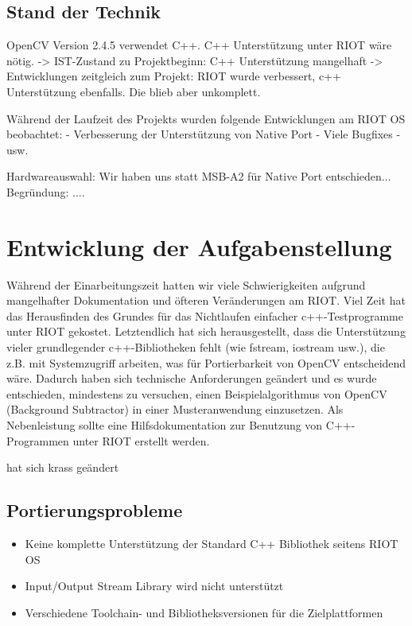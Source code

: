 \documentclass[10pt,a4paper]{article}
\begin{document}
\subsection{Stand der Technik}

OpenCV Version 2.4.5 verwendet C++.
C++ Unterstützung unter RIOT wäre nötig.
-> IST-Zustand zu Projektbeginn: C++ Unterstützung mangelhaft
-> Entwicklungen zeitgleich zum Projekt: RIOT wurde verbessert, c++ Unterstützung ebenfalls. Die blieb aber unkomplett.

Während der Laufzeit des Projekts wurden folgende Entwicklungen am RIOT OS beobachtet: 
- Verbesserung der Unterstützung von Native Port
- Viele Bugfixes
- usw.

Hardwareauswahl: Wir haben uns statt MSB-A2 für Native Port entschieden...
Begründung: ....

\newpage
\section{Entwicklung der Aufgabenstellung}
Während der Einarbeitungszeit hatten wir viele Schwierigkeiten aufgrund mangelhafter Dokumentation und öfteren Veränderungen am RIOT. Viel Zeit hat das Herausfinden des Grundes für das Nichtlaufen einfacher c++-Testprogramme unter RIOT gekostet. Letztendlich hat sich herausgestellt, dass die Unterstützung vieler grundlegender c++-Bibliotheken fehlt (wie fstream, iostream usw.), die z.B. mit Systemzugriff arbeiten, was für Portierbarkeit von OpenCV entscheidend wäre. Dadurch haben sich technische Anforderungen geändert und es wurde entschieden, mindestens zu versuchen, einen Beispielalgorithmus von OpenCV (Background Subtractor) in einer Musteranwendung einzusetzen. Als Nebenleistung sollte eine Hilfsdokumentation zur Benutzung von C++-Programmen unter RIOT erstellt werden. 


hat sich krass geändert

\subsection{Portierungsprobleme}

\begin{itemize}
\item Keine komplette Unterstützung der Standard C++ Bibliothek seitens RIOT OS
\item Input/Output Stream Library wird nicht unterstützt
\item Verschiedene Toolchain- und Bibliotheksversionen für die Zielplattformen
\end{itemize}
\end{document}
